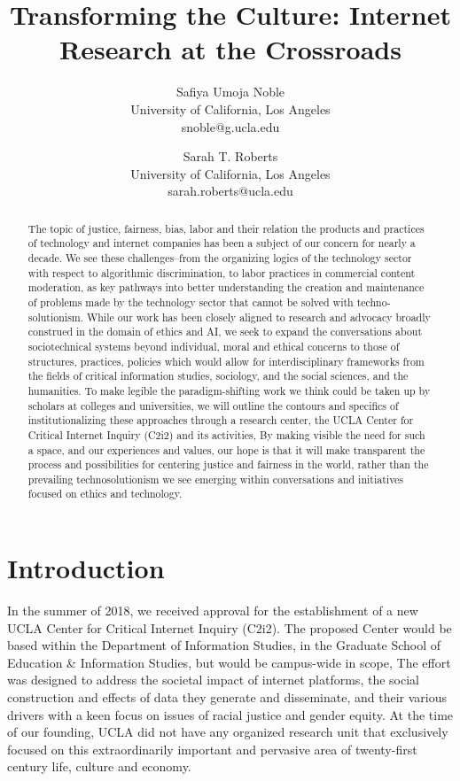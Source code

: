 \documentclass[11pt]{article}
\begin{document}
\title{Transforming the Culture: Internet Research at the Crossroads}
\author{Safiya Umoja Noble \\
University of California, Los Angeles \\
snoble@g.ucla.edu
\and
Sarah T. Roberts\\ 
University of California, Los Angeles \\ 
sarah.roberts@ucla.edu}


\maketitle
\begin{abstract}
The topic of justice, fairness, bias, labor and their relation the products and practices of technology and internet companies has been a subject of our concern for nearly a decade. We see these challenges--from the organizing logics of the technology sector with respect to algorithmic discrimination, to labor practices in commercial content moderation, as key pathways into better understanding the creation and maintenance of problems made by the technology sector that cannot be solved with techno-solutionism. While our work has been closely aligned to research and advocacy broadly construed in the domain of ethics and AI, we seek to expand the conversations about sociotechnical systems beyond individual, moral and ethical concerns to those of structures, practices, policies which would allow for interdisciplinary frameworks from the fields of critical information studies, sociology, and the social sciences, and the humanities. To make legible the paradigm-shifting work we think could be taken up by scholars at colleges and universities, we will outline the contours and specifics of institutionalizing these approaches through a research center, the UCLA Center for Critical Internet Inquiry (C2i2) and its activities, By making visible the need for such a space, and our experiences and values, our hope is that it will make transparent the process and possibilities for centering justice and fairness in the world, rather than the prevailing technosolutionism we see emerging within conversations and initiatives focused on ethics and technology.
\end{abstract}

\section{Introduction}
In the summer of 2018, we received approval for the establishment of a new UCLA Center for Critical Internet Inquiry (C2i2). The proposed Center would be based within the Department of Information Studies, in the Graduate School of Education \& Information Studies, but would be campus-wide in scope, The effort was designed to address the societal impact of internet platforms, the social construction and effects of data they generate and disseminate, and their various drivers with a keen focus on issues of racial justice and gender equity. At the time of our founding, UCLA did not have any organized research unit that exclusively focused on this extraordinarily important and pervasive area of twenty-first century life, culture and economy. 
\end{document}
